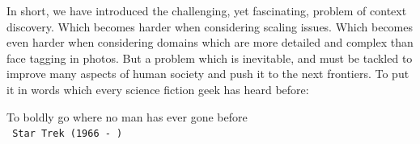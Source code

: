 In short, we have introduced the challenging, yet fascinating, problem of context discovery. Which becomes harder when considering scaling issues. Which becomes even harder when considering domains which are more detailed and complex than face tagging in photos. But a problem which is inevitable, and must be tackled to improve many aspects of human society and push it to the next frontiers. To put it in words which every science fiction geek has heard before:

\centering
To boldly go where no man has ever gone before \\
\setlength{\parindent}{8cm} \texttt{ Star Trek (1966 - ) } 
